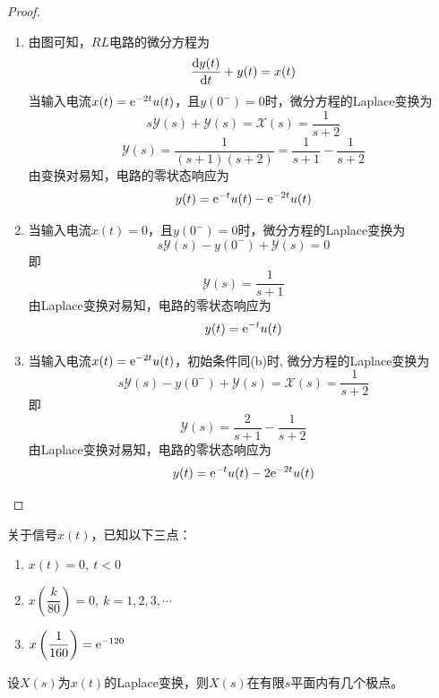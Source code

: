 \begin{proof}

    \begin{enumerate}

        \item 
            由图可知，$RL$电路的微分方程为
            $$\dfrac{\mathrm{d} y(t)}{\mathrm{d} t} + y(t) = x(t)$$
            当输入电流$x(t) = \mathrm{e}^{-2t}u(t)$，且$y(0^{-}) = 0$时，微分方程的\textup{Laplace}变换为
            $$s\mathscr{Y}(s) + \mathscr{Y}(s) = \mathscr{X}(s) = \dfrac{1}{s + 2}$$
            $$\mathscr{Y}(s) = \dfrac{1}{(s + 1)(s + 2)} = \dfrac{1}{s + 1} - \dfrac{1}{s + 2}$$
            由变换对易知，电路的零状态响应为
            $$y(t) = \mathrm{e}^{-t}u(t) - \mathrm{e}^{-2t}u(t)$$

        \item 
            当输入电流$x(t) = 0$，且$y(0^{-}) = 0$时，微分方程的\textup{Laplace}变换为
            $$s\mathscr{Y}(s) - y(0^{-}) + \mathscr{Y}(s) = 0$$
            即
            $$\mathscr{Y}(s) = \dfrac{1}{s + 1}$$
            由\textup{Laplace}变换对易知，电路的零状态响应为
            $$y(t) = \mathrm{e}^{-t}u(t)$$
        \item 
            当输入电流$x(t) =  \mathrm{e}^{-2t}u(t)$，初始条件同\textup{(b)}时,
            微分方程的\textup{Laplace}变换为
            $$s\mathscr{Y}(s) - y(0^{-}) + \mathscr{Y}(s) = \mathscr{X}(s) = \dfrac{1}{s + 2}$$
            即
            $$\mathscr{Y}(s) = \dfrac{2}{s + 1}  - \dfrac{1}{s + 2}$$
            由\textup{Laplace}变换对易知，电路的零状态响应为
            $$y(t) = \mathrm{e}^{-t}u(t) - 2\mathrm{e}^{-2t}u(t)$$
    \end{enumerate}

    
\end{proof}


\begin{proposition}
    
    关于信号$x(t)$，已知以下三点：
    
    \begin{enumerate}

        \item $x(t) = 0,\ t < 0$
        
        \item $x \left( \dfrac{k}{80} \right) = 0, \ k = 1, 2, 3, \cdots$
        
        \item $x \left( \dfrac{1}{160} \right) = \mathrm{e}^{-120}$
        
   \end{enumerate}

   设$X(s)$为$x(t)$的\textup{Laplace}变换，则$X(s)$在有限$s$平面内有几个极点。

\end{proposition}

